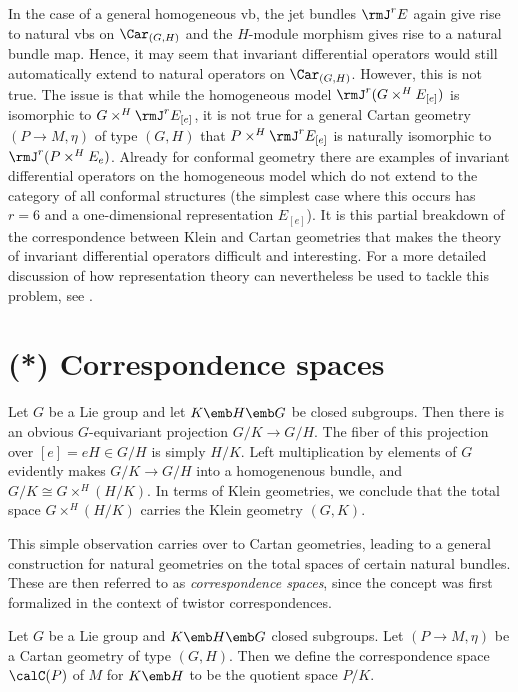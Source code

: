 In the case of a general homogeneous \gls{vb}, the jet bundles $\rmJ^r E$ again give rise to natural \glspl{vb} on $\Car_{(G,H)}$ and the $H$-module morphism gives rise to a natural bundle map. Hence, it may seem that invariant differential operators would still automatically extend to natural operators on $\Car_{(G,H)}$. However, this is not true. The issue is that while the homogeneous model $\rmJ^r(G\times^H E_{[e]})$ is isomorphic to $G\times^H \rmJ^r E_{[e]}$, it is not true for a general Cartan geometry $(P\to M,\eta)$ of type $(G,H)$ that $P\times^H \rmJ^r E_{[e]}$ is naturally isomorphic to $\rmJ^r(P\times^H E_{e})$. Already for conformal geometry there are examples of invariant differential operators on the homogeneous model which do not extend to the category of all conformal structures (the simplest case where this occurs has $r=6$ and a one-dimensional representation $E_{[e]}$). It is this partial breakdown of the correspondence between Klein and Cartan geometries that makes the theory of invariant differential operators difficult and interesting. For a more detailed discussion of how representation theory can nevertheless be used to tackle this problem, see \cite[Thm.~1.5.10]{Cap}.






\section{(*) Correspondence spaces}

Let $G$ be a Lie group and let $K\emb H\emb G$ be closed subgroups. Then there is an obvious $G$-equivariant projection $G\slash K\to G\slash H$. The fiber of this projection over $[e]=eH\in G\slash H$ is simply $H\slash K$. Left multiplication by elements of $G$ evidently makes $G\slash K\to G\slash H$ into a homogenenous bundle, and $G\slash K\cong G\times^H (H\slash K)$. In terms of Klein geometries, we conclude that the total space $G\times^H (H\slash K)$ carries the Klein geometry $(G,K)$.

This simple observation carries over to Cartan geometries, leading to a general construction for natural geometries on the total spaces of certain natural bundles. These are then referred to as \emph{correspondence spaces}, since the concept was first formalized in the context of twistor correspondences. 

\begin{defn}
    Let $G$ be a Lie group and $K\emb H\emb G$ closed subgroups. Let $(P\to M,\eta)$ be a Cartan geometry of type $(G,H)$. Then we define the correspondence space $\calC(P)$ of $M$ for $K\emb H$ to be the quotient space $P\slash K$.
\end{defn}

